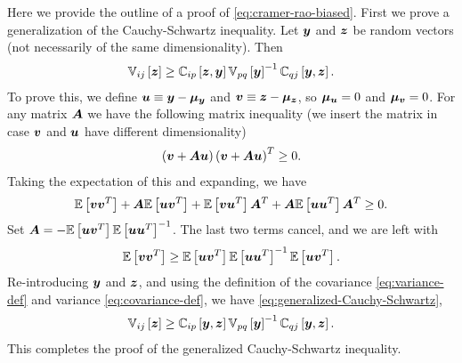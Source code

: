 Here we provide the outline of a proof of \eqref{eq:cramer-rao-biased}.
First we prove a generalization of the Cauchy-Schwartz inequality.
Let ${\bm y}$ and ${\bm z}$ be random vectors (not necessarily of the same dimensionality).
Then
\begin{align}
    \label{eq:generalized-Cauchy-Schwartz}
    \mathbb{V}_{ij}\left[{\bm z}\right]
    \geq
    \mathbb{C}_{ip}\left[{\bm z},{\bm y}\right]
    \mathbb{V}_{pq}\left[{\bm y}\right]^{-1}
    \mathbb{C}_{qj}\left[{\bm y},{\bm z}\right]
    .
\end{align}
To prove this, we define ${\bm u} \equiv {\bm y} - {\bm \mu}_{{\bm y}}$
and ${\bm v} \equiv {\bm z} - {\bm \mu}_{{\bm z}}$, so ${\bm \mu}_{{\bm u}}=0$ and ${\bm \mu}_{{\bm v}}=0$.
For any matrix ${\bm A}$ we have the following matrix inequality 
(we insert the matrix in case ${\bm v}$ and ${\bm u}$ have different dimensionality)
\begin{align}
    \left({\bm v} + {\bm A}{\bm u}\right)
    \left({\bm v} + {\bm A}{\bm u}\right)^T
    \geq 
    0
    .
\end{align}
Taking the expectation of this and expanding, we have
\begin{align}
    \mathbb{E}\left[{\bm v}{\bm v}^T\right]
    +
    {\bm A}\mathbb{E}\left[{\bm u}{\bm v}^T\right]
    +
    \mathbb{E}\left[{\bm v}{\bm u}^T\right]{\bm A}^T
    +
    {\bm A}\mathbb{E}\left[{\bm u}{\bm u}^T\right]{\bm A}^T
    \geq
    0
    .
\end{align}
Set ${\bm A} = - \mathbb{E}\left[{\bm u}{\bm v}^T\right] \mathbb{E}\left[{\bm u}{\bm u}^T\right]^{-1}$.
The last two terms cancel, and we are left with
\begin{align}
    \mathbb{E}\left[{\bm v}{\bm v}^T\right]
    \geq  
    \mathbb{E}\left[{\bm u}{\bm v}^T\right] 
    \mathbb{E}\left[{\bm u}{\bm u}^T\right]^{-1} 
    \mathbb{E}\left[{\bm u}{\bm v}^T\right]
    .
\end{align}
Re-introducing ${\bm y}$ and ${\bm z}$, and using the definition of the covariance 
\eqref{eq:variance-def} and variance \eqref{eq:covariance-def}, 
we have \eqref{eq:generalized-Cauchy-Schwartz},
\begin{align}
    \mathbb{V}_{ij}\left[{\bm z}\right]
    \geq  
    \mathbb{C}_{ip}\left[{\bm y},{\bm z}\right] 
    \mathbb{V}_{pq}\left[{\bm y}\right]^{-1} 
    \mathbb{C}_{qj}\left[{\bm y},{\bm z}\right]
    .
\end{align}
This completes the proof of the generalized Cauchy-Schwartz inequality.

